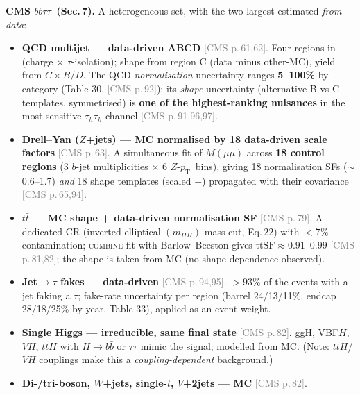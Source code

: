 \documentclass[11pt]{article}
\newcommand{\mhh}{\ensuremath{m_{HH}}}
\newcommand{\bbtt}{\ensuremath{b\bar b\tau\tau}}
\newcommand{\ptt}{\ensuremath{p_{\mathrm T}}}
\newcommand{\pC}[1]{\textcolor{gray}{\small[CMS p.\,#1]}}
\begin{document}
\noindent\textbf{CMS \bbtt\ (Sec.\,7).} A heterogeneous set, with the two largest estimated \emph{from data}:
\begin{itemize}
\item \textbf{QCD multijet --- data-driven ABCD} \pC{61,62}. Four regions in (charge $\times$ $\tau$-isolation);
  shape from region C (data minus other-MC), yield from $C\times B/D$. The QCD \emph{normalisation} uncertainty
  ranges \textbf{5--100\%} by category (Table 30, \pC{92}); its \emph{shape} uncertainty (alternative B-vs-C
  templates, symmetrised) is \textbf{one of the highest-ranking nuisances} in the most sensitive
  $\tau_h\tau_h$ channel \pC{91,96,97}.
\item \textbf{Drell--Yan ($Z$+jets) --- MC normalised by 18 data-driven scale factors} \pC{63}. A simultaneous fit
  of $M(\mu\mu)$ across \textbf{18 control regions} (3 $b$-jet multiplicities $\times$ 6 $Z$-\ptt\ bins), giving 18
  normalisation SFs ($\sim$0.6--1.7) \emph{and} 18 shape templates (scaled $\pm$) propagated with their covariance
  \pC{65,94}.
\item \textbf{$t\bar t$ --- MC shape + data-driven normalisation SF} \pC{79}. A dedicated CR (inverted elliptical
  $(\mhh)$ mass cut, Eq.\,22) with $<7\%$ contamination; \textsc{combine} fit with Barlow--Beeston gives
  $\text{ttSF}\approx0.91$--$0.99$ \pC{81,82}; the shape is taken from MC (no shape dependence observed).
\item \textbf{Jet$\to\tau$ fakes --- data-driven} \pC{94,95}. $>93\%$ of the events with a jet faking a $\tau$;
  fake-rate uncertainty per region (barrel 24/13/11\%, endcap 28/18/25\% by year, Table 33), applied as an
  event weight.
\item \textbf{Single Higgs --- irreducible, same final state} \pC{82}. ggH, VBF$H$, $VH$, $t\bar tH$ with $H\to
  b\bar b$ or $\tau\tau$ mimic the signal; modelled from MC. (Note: $t\bar tH$/$VH$ couplings make this a
  \emph{coupling-dependent} background.)
\item \textbf{Di-/tri-boson, $W$+jets, single-$t$, $V$+2jets --- MC} \pC{82}.
\end{itemize}
\end{document}
